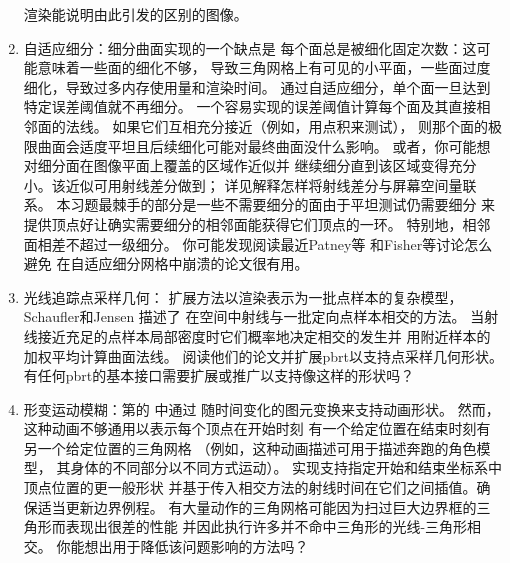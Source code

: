 \begin{enumerate}
          渲染能说明由此引发的区别的图像。
    \item \circlethree 自适应细分：细分曲面实现的一个缺点是
          每个面总是被细化固定次数：这可能意味着一些面的细化不够，
          导致三角网格上有可见的小平面，一些面过度细化，导致过多内存使用量和渲染时间。
          通过自适应细分，单个面一旦达到特定误差阈值就不再细分。
          一个容易实现的误差阈值计算每个面及其直接相邻面的法线。
          如果它们互相充分接近（例如，用点积来测试），
          则那个面的极限曲面会适度平坦且后续细化可能对最终曲面没什么影响。
          或者，你可能想对细分面在图像平面上覆盖的区域作近似并
          继续细分直到该区域变得充分小。该近似可用射线差分做到；
          详见解释怎样将射线差分与屏幕空间量联系。
          本习题最棘手的部分是一些不需要细分的面由于平坦测试仍需要细分
          来提供顶点好让确实需要细分的相邻面能获得它们顶点的一环。
          特别地，相邻面相差不超过一级细分。
          你可能发现阅读最近Patney等\parencite*{10.1145/1572769.1572785}
          和Fisher等\parencite*{10.1145/1661412.1618496}讨论怎么避免
          在自适应细分网格中崩溃的论文很有用。
    \item \circlethree 光线追踪点采样几何：
          扩展方法以渲染表示为一批点样本的复杂模型\citep{10.1111/1467-8659.t01-2-00647,10.1145/344779.344936,10.1145/344779.344940}，
          Schaufler和Jensen \parencite*{10.1007/978-3-7091-6303-0_29}描述了
          在空间中射线与一批定向点样本相交的方法。
          当射线接近充足的点样本局部密度时它们概率地决定相交的发生并
          用附近样本的加权平均计算曲面法线。
          阅读他们的论文并扩展pbrt以支持点采样几何形状。
          有任何pbrt的基本接口需要扩展或推广以支持像这样的形状吗？
    \item \circlethree 形变运动模糊：第的
          中通过
          随时间变化的图元变换来支持动画形状。
          然而，这种动画不够通用以表示每个顶点在开始时刻
          有一个给定位置在结束时刻有另一个给定位置的三角网格
          （例如，这种动画描述可用于描述奔跑的角色模型，
          其身体的不同部分以不同方式运动）。
          实现支持指定开始和结束坐标系中顶点位置的更一般形状
          并基于传入相交方法的射线时间在它们之间插值。确保适当更新边界例程。
          有大量动作的三角网格可能因为扫过巨大边界框的三角形而表现出很差的性能
          并因此执行许多并不命中三角形的光线-三角形相交。
          你能想出用于降低该问题影响的方法吗？

\end{enumerate}

